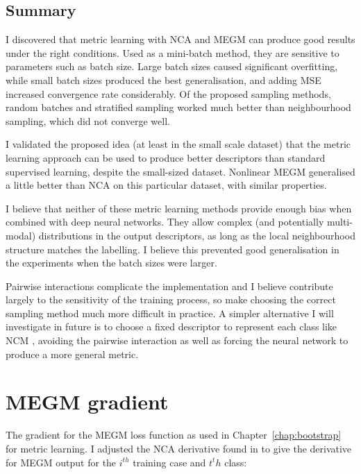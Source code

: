 \section {Summary}

I discovered that metric learning with \gls{NCA} and \gls{MEGM} can produce good results under the right conditions. Used as a mini-batch method, they are sensitive to parameters such as batch size. Large batch sizes caused significant overfitting, while small batch sizes produced the best generalisation, and adding \gls{MSE} increased convergence rate considerably. Of the proposed sampling methods, random batches and stratified sampling worked much better than neighbourhood sampling, which did not converge well.


I validated the proposed idea (at least in the small scale dataset) that the metric learning approach can be used to produce better descriptors than
standard supervised learning, despite the small-sized dataset. Nonlinear \gls{MEGM} generalised a little better than NCA on this particular dataset, with similar
properties.

I believe that neither of these metric learning methods provide enough bias when combined with deep neural networks. They allow
complex (and potentially multi-modal) distributions in the output descriptors, as long as the local neighbourhood structure matches the labelling. I believe this prevented good generalisation in the experiments when the batch sizes were larger.

Pairwise interactions complicate the implementation and I believe contribute largely to the sensitivity of the training process, so make choosing the correct sampling method much more difficult in practice. A simpler alternative I will investigate in future is to choose a fixed descriptor to represent each class like \gls{NCM} \cite {Mensink2012}, avoiding the pairwise interaction as well as forcing the neural network to produce a more general metric.

\chapter{MEGM gradient}
\label{chap:megm_appendix} 

The gradient for the \gls{MEGM} loss function as used in Chapter~\ref{chap:bootstrap} for metric learning. I adjusted the \gls{NCA} derivative found in \cite {Salakhutdinov2007a} to give the derivative for \gls{MEGM} output for the $ i^{th} $ training case and $ t^th $ class:

